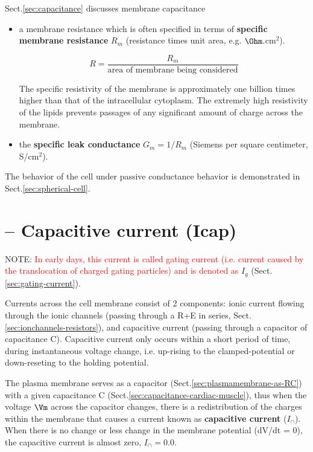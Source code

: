 Sect.\ref{sec:capacitance} discusses membrane
capacitance
\begin{itemize}

  \item  a membrane resistance which is often specified in terms of {\bf
  specific membrane resistance} $R_m$ (resistance times unit area, e.g. $\Ohm.$cm$^2$).

\begin{equation}
R = \frac{R_m}{\text{area of membrane being considered}}
\end{equation}

The specific resistivity of the membrane is approximately one
billion times higher than that of the intracellular cytoplasm.
The extremely high resistivity of the lipids prevents passages of any
significant amount of charge across the membrane.

  \item the {\bf specific leak conductance} $G_m = 1/R_m$ (Siemens per square
  centimeter, S/cm$^2$).

\end{itemize}

The behavior of the cell under passive conductance behavior is demonstrated in
Sect.\ref{sec:spherical-cell}.


\section{-- Capacitive current (Icap)}
\label{sec:capacitive-current}

NOTE: \textcolor{red}{In early days, this current is called gating current (i.e.
current caused by the translocation of charged gating particles) and is denoted
as } $I_g$ (Sect.\ref{sec:gating-current}).

Currents across the cell membrane consist of 2 components:
ionic current flowing through the ionic channels (passing through a R+E in
series, Sect.\ref{sec:ionchannels-resistors}), and capacitive current (passing
through a capacitor of capacitance C). Capacitive current only occurs within a
short period of time, during instantaneous voltage change, i.e. up-rising to the
clamped-potential or down-reseting to the holding potential.

The plasma membrane serves as a capacitor (Sect.\ref{sec:plasmamembrane-as-RC})
with a given capacitance C (Sect.\ref{sec:capacitance-cardiac-muscle}), thus
when the voltage $\Vm$ across the capacitor changes, there is a redistribution
of the charges within the membrane that causes a current known as {\bf
capacitive current} ($I_\cap$).
When there is no change or less change in the membrane potential (dV/dt = 0),
the capacitive current is almost zero, $I_\cap = 0.0$.

